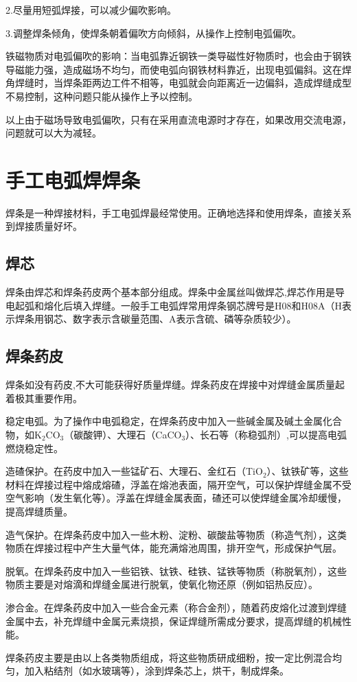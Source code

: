\documentclass{ctexbook}
\begin{document}
2.尽量用短弧焊接，可以减少偏吹影响。

3.调整焊条倾角，使焊条朝着偏吹方向倾斜，从操作上控制电弧偏吹。

铁磁物质对电弧偏吹的影响：当电弧靠近钢铁一类导磁性好物质时，也会由于钢铁导磁能力强，造成磁场不均匀，而使电弧向钢铁材料靠近，出现电弧偏斜。这在焊角焊缝时，当焊条距两边工件不相等，电弧就会向距离近一边偏斜，造成焊缝成型不易控制，这种问题只能从操作上予以控制。

以上由于磁场导致电弧偏吹，只有在采用直流电源时才存在，如果改用交流电源，问题就可以大为减轻。
\section{手工电弧焊焊条}
焊条是一种焊接材料，手工电弧焊最经常使用。正确地选择和使用焊条，直接关系到焊接质量好坏。
\subsection{焊芯}
焊条由焊芯和焊条药皮两个基本部分组成。焊条中金属丝叫做焊芯,焊芯作用是导电起弧和熔化后填入焊缝。一般手工电弧焊常用焊条钢芯牌号是H08和H08A（H表示焊条用钢芯、数字表示含碳量范围、A表示含硫、磷等杂质较少）。
\subsection{焊条药皮}
焊条如没有药皮,不大可能获得好质量焊缝。焊条药皮在焊接中对焊缝金属质量起着极其重要作用。

稳定电弧。为了操作中电弧稳定，在焊条药皮中加入一些碱金属及碱土金属化合物，如K$_2$CO$_3$（碳酸钾）、大理石（CaCO$_3$）、长石等（称稳弧剂）,可以提高电弧燃烧稳定性。

造碴保护。在药皮中加入一些锰矿石、大理石、金红石（TiO$_2$）、钛铁矿等，这些材料在焊接过程中熔成熔碴，浮盖在熔池表面，隔开空气，可以保护焊缝金属不受空气影响（发生氧化等）。浮盖在焊缝金属表面，碴还可以使焊缝金属冷却缓慢，提高焊缝质量。

造气保护。在焊条药皮中加入一些木粉、淀粉、碳酸盐等物质（称造气剂），这类物质在焊接过程中产生大量气体，能充满熔池周围，排开空气，形成保护气层。

脱氧。在焊条药皮中加入一些铝铁、钛铁、硅铁、锰铁等物质（称脱氧剂），这些物质主要是对熔滴和焊缝金属进行脱氧，使氧化物还原（例如铝热反应）。

渗合金。在焊条药皮中加入一些合金元素（称合金剂），随着药皮熔化过渡到焊缝金属中去，补充焊缝中金属元素烧损，保证焊缝所需成分要求，提高焊缝的机械性能。

焊条药皮主要是由以上各类物质组成，将这些物质研成细粉，按一定比例混合均匀，加入粘结剂（如水玻璃等），涂到焊条芯上，烘干，制成焊条。
\end{document}

